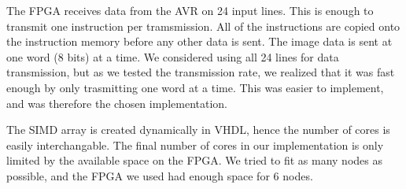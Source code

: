 The FPGA receives data from the AVR on 24 input lines. This is enough to
transmit one instruction per tramsmission. All of the instructions are copied
onto the instruction memory before any other data is sent. The image data is
sent at one word (8 bits) at a time. We considered using all 24 lines for data
transmission, but as we tested the transmission rate, we realized that it was
fast enough by only trasmitting one word at a time. This was easier to
implement, and was therefore the chosen implementation.

The SIMD array is created dynamically in VHDL, hence the number of cores is
easily interchangable. The final number of cores in our implementation is only
limited by the available space on the FPGA. We tried to fit as many nodes as
possible, and the FPGA we used had enough space for 6 nodes.
